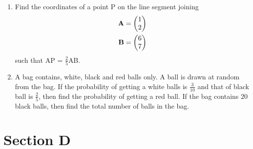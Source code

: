 \documentclass[journal,12pt,twocolumn]{IEEEtran}
\renewcommand\thesection{\arabic{section}}
\begin{document}
\begin{enumerate}[label=\thesection.\arabic*.,ref=\thesection.\theenumi]
\item Find the coordinates of a point P on the line segment joining
\begin{align}
\mathbf{A} &= \begin{pmatrix}1\\2\end{pmatrix}\\
\mathbf{B} &= \begin{pmatrix}6\\7\end{pmatrix}
\end{align}
such that AP = $\frac{2}{5}$AB.
\item A bag contains, white, black and red balls only. A ball is drawn at random from the bag. If the probability of getting a white balls is $\frac{3}{10}$ and that of black ball is $\frac{2}{5}$, then find the probability of getting a red ball. If the bag contains $20$ black balls, then find the total number of balls in the bag.
\end{enumerate}
\section{Section D}
\renewcommand{\theequation}{\theenumi}
\end{document}
